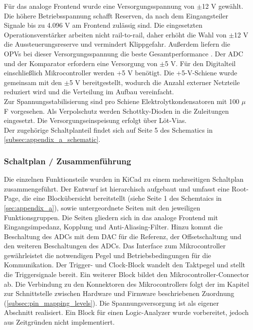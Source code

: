 \documentclass[a4paper, portrait, 12pt]{scrartcl} %
\begin{document}
Für das analoge Frontend wurde eine Versorgungsspannung von $\pm$12 V gewählt. Die höhere Betriebsspannung schafft Reserven, da nach dem Eingangsteiler Signale bis zu 4.096 V am Frontend zulässig sind. Die eingesetzten Operationsverstärker arbeiten nicht rail-to-rail, daher erhöht die Wahl von $\pm$12 V die Aussteuerungsreserve und vermindert Klippgefahr. Außerdem liefern die OPVs bei dieser Versorgungsspannung die beste Gesamtperformance \cite[S. 1 u. 13]{AnalogDevices8022}. Der ADC und der Komparator erfordern eine Versorgung von $\pm$5 V. Für den Digitalteil einschließlich Mikrocontroller werden +5 V benötigt. Die +5-V-Schiene wurde gemeinsam mit den $\pm$5 V bereitgestellt, wodurch die Anzahl externer Netzteile reduziert wird und die Verteilung im Aufbau vereinfacht.\\
Zur Spannungsstabilisierung sind pro Schiene Elektrolytkondensatoren mit 100 $\mu$F vorgesehen. Als Verpolschutz werden Schottky-Dioden in die Zuleitungen eingesetzt. Die Versorgungseinspeisung erfolgt über Löt-Vias.\\
Der zugehörige Schaltplanteil findet sich auf Seite 5 des Schematics in \autoref{subsec:appendix_a_schematic}.

\subsubsection{Schaltplan / Zusammenführung}

Die einzelnen Funktionsteile wurden in KiCad zu einem mehrseitigen Schaltplan zusammengeführt. Der Entwurf ist hierarchisch aufgebaut und umfasst eine Root-Page, die eine Blockübersicht bereitstellt (siehe Seite 1 des Schemtaics in \autoref{sec:appendix_a}), sowie untergeordnete Seiten mit den jeweiligen Funktionsgruppen. Die Seiten gliedern sich in das analoge Frontend mit Eingangsimpedanz, Kopplung und Anti-Aliasing-Filter. Hinzu kommt die Beschaltung des ADCs mit dem DAC für die Referenz, der Offsetschaltung und den weiteren Beschaltungen des ADCs. Das Interface zum Mikrocontroller gewährleistet die notwendigen Pegel und Betriebsbedingungen für die Kommunikation. Der Trigger- und Clock-Block wandelt den Taktpegel und stellt die Triggersignale bereit. Ein weiterer Block bildet den Mikrocontroller-Connector ab. Die Verbindung zu den Konnektoren des Mikrocontrollers folgt der im Kapitel zur Schnittstelle zwischen Hardware und Firmware beschriebenen Zuordnung (\autoref{subsec:pin_mapping_levels}). Die Spannungsversorgung ist als eigener Abschnitt realisiert. Ein Block für einen Logic-Analyzer wurde vorbereitet, jedoch aus Zeitgründen nicht implementiert.\\
\end{document}
